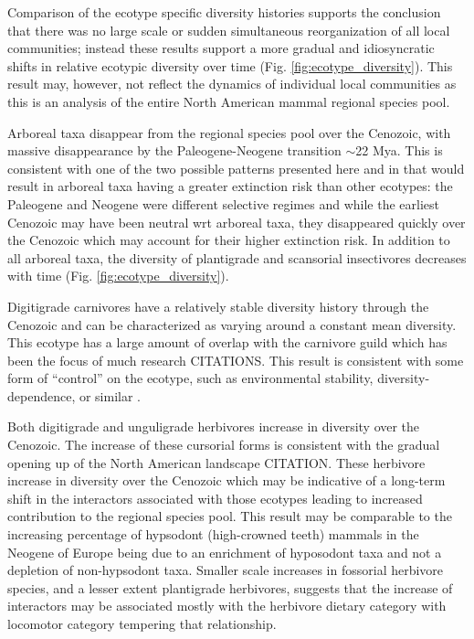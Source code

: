\documentclass[12pt,letterpaper]{article}
\begin{document}
Comparison of the ecotype specific diversity histories supports the conclusion that there was no large scale or sudden simultaneous reorganization of all local communities; instead these results support a more gradual and idiosyncratic shifts in relative ecotypic diversity over time (Fig. \ref{fig:ecotype_diversity}). This result may, however, not reflect the dynamics of individual local communities as this is an analysis of the entire North American mammal regional species pool.

Arboreal taxa disappear from the regional species pool over the Cenozoic, with massive disappearance by the Paleogene-Neogene transition \(\sim\)22 Mya. This is consistent with one of the two possible patterns presented here and in \citet{Smits2015b} that would result in arboreal taxa having a greater extinction risk than other ecotypes: the Paleogene and Neogene were different selective regimes and while the earliest Cenozoic may have been neutral wrt arboreal taxa, they disappeared quickly over the Cenozoic which may account for their higher extinction risk. In addition to all arboreal taxa, the diversity of plantigrade and scansorial insectivores decreases with time (Fig. \ref{fig:ecotype_diversity}).

Digitigrade carnivores have a relatively stable diversity history through the Cenozoic and can be characterized as varying around a constant mean diversity. This ecotype has a large amount of overlap with the carnivore guild which has been the focus of much research CITATIONS. This result is consistent with some form of ``control'' on the ecotype, such as environmental stability, diversity-dependence, or similar \citet{Slater2015c,Silvestro2015b}.

Both digitigrade and unguligrade herbivores increase in diversity over the Cenozoic. The increase of these cursorial forms is consistent with the gradual opening up of the North American landscape CITATION. These herbivore increase in diversity over the Cenozoic which may be indicative of a long-term shift in the interactors associated with those ecotypes leading to increased contribution to the regional species pool. This result may be comparable to the increasing percentage of hypsodont (high-crowned teeth) mammals in the Neogene of Europe being due to an enrichment of hyposodont taxa and not a depletion of non-hypsodont taxa. Smaller scale increases in fossorial herbivore species, and a lesser extent plantigrade herbivores, suggests that the increase of interactors may be associated mostly with the herbivore dietary category with locomotor category tempering that relationship.
\end{document}
